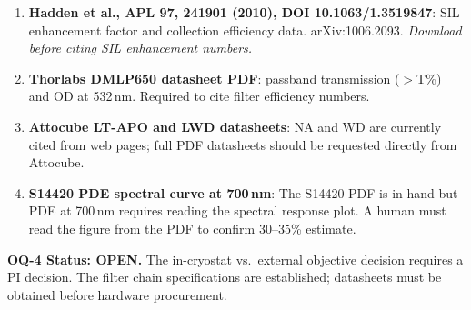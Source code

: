 \begin{enumerate}
  \item \textbf{Hadden et al., APL 97, 241901 (2010), DOI 10.1063/1.3519847}:
    SIL enhancement factor and collection efficiency data. arXiv:1006.2093.
    \emph{Download before citing SIL enhancement numbers.}
  \item \textbf{Thorlabs DMLP650 datasheet PDF}: passband transmission ($>$T\%)
    and OD at 532\,nm. Required to cite filter efficiency numbers.
  \item \textbf{Attocube LT-APO and LWD datasheets}: NA and WD are currently
    cited from web pages; full PDF datasheets should be requested directly from Attocube.
  \item \textbf{S14420 PDE spectral curve at 700\,nm}: The S14420 PDF is in
    hand but PDE at 700\,nm requires reading the spectral response plot.
    A human must read the figure from the PDF to confirm 30--35\% estimate.
\end{enumerate}

\textbf{OQ-4 Status: OPEN.} The in-cryostat vs.\ external objective decision requires
a PI decision. The filter chain specifications are established; datasheets must be obtained
before hardware procurement.
